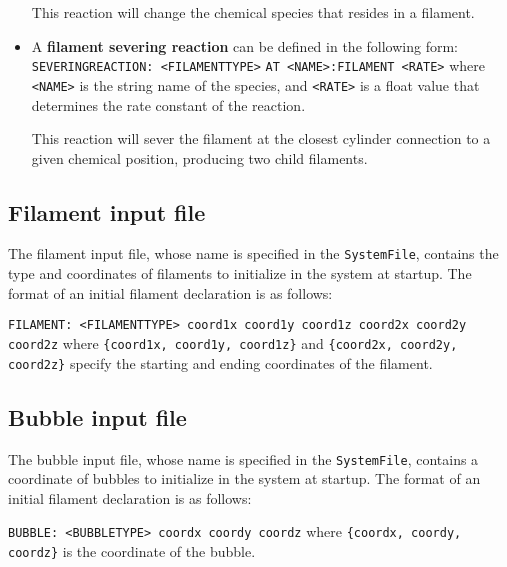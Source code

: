 \documentclass[11pt, oneside]{article}   	%
\begin{document}
\begin{itemize}
This reaction will change the chemical species that resides in a filament.

\item A \textbf{filament severing reaction} can be defined in the following form:\newline\newline
\texttt{SEVERINGREACTION: <FILAMENTTYPE>}\newline
\texttt{AT <NAME>:FILAMENT <RATE>}\newline\newline
where \texttt{<NAME>} is the string name of the species, and \texttt{<RATE>} is a float value that determines the rate constant of the reaction.

This reaction will sever the filament at the closest cylinder connection to a given chemical position, producing two child filaments.

\end{itemize}

\subsection{Filament input file}

The filament input file, whose name is specified in the \texttt{SystemFile}, contains the type and coordinates of filaments to initialize in the system at startup. The format of an initial filament declaration is as follows:\newline

\texttt{FILAMENT: <FILAMENTTYPE> coord1x coord1y coord1z coord2x coord2y coord2z}\newline\newline
\noindent where \texttt{\{coord1x, coord1y, coord1z\}} and \texttt{\{coord2x, coord2y, coord2z\}} specify the starting and 
ending coordinates of the filament.

\subsection{Bubble input file}

The bubble input file, whose name is specified in the \texttt{SystemFile}, contains a coordinate of bubbles to initialize in the system at startup. The format of an initial filament declaration is as follows:\newline

\texttt{BUBBLE: <BUBBLETYPE> coordx coordy coordz}\newline\newline
\noindent where \texttt{\{coordx, coordy, coordz\}} is the coordinate of the bubble.
\end{document}
